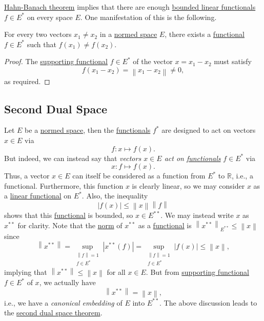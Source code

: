 \hyperref[thm:Hahn-Banach]{Hahn-Banach theorem} implies that there are enough \hyperref[def:bounded-linear-functional]{bounded linear functionals} \(f\in E^{\ast} \) on every space \(E\). One manifestation of this is the following.
\begin{corollary}
	For every two vectors \(x_1 \neq x_2\) in a \hyperref[def:normed-vector-space]{normed space} \(E\), there exists a \hyperref[def:linear-functional]{functional} \(f\in E^{\ast} \) such that \(f(x_1) \neq f(x_2)\).
\end{corollary}
\begin{proof}
	The \hyperref[thm:supporting-functional]{supporting functional} \(f\in E^{\ast} \) of the vector \(x = x_1 - x_2\) must satisfy
	\[
		f(x_1 - x_2)= \left\lVert x_1 - x_2\right\rVert \neq 0,
	\]
	as required.
\end{proof}

\subsection{Second Dual Space}
Let \(E\) be a \hyperref[def:normed-vector-space]{normed space}, then the \hyperref[def:linear-functional]{functionals} \(f^{\ast} \) are designed to act on vectors \(x\in E\) via
\[
	f\colon x \mapsto f(x).
\]
But indeed, we can instead say that \emph{vectors \(x\in E\) act on \hyperref[def:linear-functional]{functionals}} \(f\in E^{\ast} \) via
\[
	x\colon f\mapsto f(x).
\]
Thus, a vector \(x\in E\) can itself be considered as a function from \(E^{\ast} \) to \(\mathbb{R} \), i.e., a functional. Furthermore, this function \(x\) is clearly linear, so we may consider \(x\) as a \hyperref[def:linear-functional]{linear functional} on \(E^{\ast} \). Also, the inequality
\[
	\left\vert f(x) \right\vert \leq \left\lVert x\right\rVert \left\lVert f\right\rVert
\]
shows that this \hyperref[def:linear-functional]{functional} is bounded, so \(x\in E^{\ast\ast} \). We may instead write \(x\) as \(x^{\ast\ast} \) for clarity. Note that the \hyperref[def:norm]{norm} of \(x^{\ast\ast} \) as a \hyperref[def:linear-functional]{functional} is \(\left\lVert x^{\ast\ast} \right\rVert _{E^{\ast\ast} } \leq \left\lVert x\right\rVert \) since
\[
	\left\lVert x^{\ast\ast} \right\rVert = \sup _{\substack{\left\lVert f\right\rVert = 1\\ f\in E^{\ast} }}\left\vert x^{\ast\ast} (f) \right\vert = \sup _{\substack{\left\lVert f\right\rVert = 1\\ f\in E^{\ast}}} \left\vert f(x) \right\vert  \leq \left\lVert x\right\rVert,
\]
implying that \(\left\lVert x^{\ast\ast} \right\rVert \leq \left\lVert x\right\rVert \) for all \(x\in E\). But from \hyperref[thm:supporting-functional]{supporting functional} \(f\in E^{\ast} \) of \(x\), we actually have
\[
	\left\lVert x^{\ast\ast} \right\rVert = \left\lVert x\right\rVert,
\]
i.e., we have a \emph{canonical embedding} of \(E\) into \(E^{\ast\ast}\). The above discussion leads to the \hyperref[thm:second-dual-space]{second dual space theorem}.

